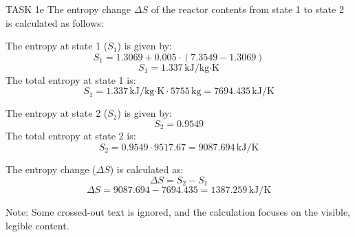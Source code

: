 TASK 1e  
The entropy change \( \Delta S \) of the reactor contents from state 1 to state 2 is calculated as follows:

The entropy at state 1 (\( S_1 \)) is given by:  
\[
S_1 = 1.3069 + 0.005 \cdot (7.3549 - 1.3069)
\]  
\[
S_1 = 1.337 \, \text{kJ/kg·K}
\]  
The total entropy at state 1 is:  
\[
S_1 = 1.337 \, \text{kJ/kg·K} \cdot 5755 \, \text{kg} = 7694.435 \, \text{kJ/K}
\]

The entropy at state 2 (\( S_2 \)) is given by:  
\[
S_2 = 0.9549
\]  
The total entropy at state 2 is:  
\[
S_2 = 0.9549 \cdot 9517.67 = 9087.694 \, \text{kJ/K}
\]

The entropy change (\( \Delta S \)) is calculated as:  
\[
\Delta S = S_2 - S_1
\]  
\[
\Delta S = 9087.694 - 7694.435 = 1387.259 \, \text{kJ/K}
\]  

Note: Some crossed-out text is ignored, and the calculation focuses on the visible, legible content.